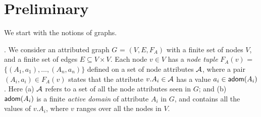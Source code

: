 \vspace{-1ex}
\section{Preliminary}
\label{sec-pre}

\vspace{-1ex}
We start with the notions of graphs.

. We consider an 
attributed graph
$G$ = $(V,E,F_A)$ with a finite set of
nodes $V$, and
a finite set of edges $E\subseteq V\times V$.
Each node $v\in V$ has a
{\em node tuple} $F_A(v)$ =
$\{(A_1, a_1), \ldots, (A_n,a_n)\}$
defined on a set of node attributes ${\cal A}$,
where a pair $(A_i, a_i)\in F_A(v)$
states that the attribute $v.A_i\in{\cal A}$ has
a value $a_i\in{\ensuremath {\mathsf{adom}}}(A_i)$. Here
(a) ${\cal A}$ refers to a set of all the node
attributes seen in $G$; and (b)
${\mathsf{adom}}(A_i)$ is a finite {\em active domain} of
attribute $A_i$ in $G$, and contains
all the values of $v.A_i$, where $v$ ranges
over all the nodes in $V$.





